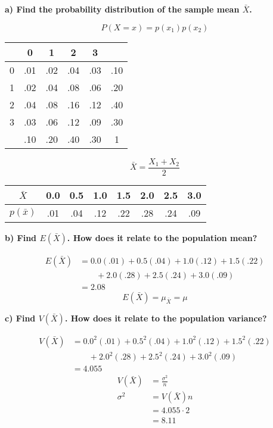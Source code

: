 \documentclass[12pt, letter]{article}
\begin{document}
\qquad \textbf{a) Find the probability distribution of the sample mean $\bar{X}$.}
\begin{center}
	$$P(X = x) = p(x_{1})p(x_{2})$$
	\newline
	\newline
	\def\arraystretch{1.2}
	\begin{tabular}{c|cccc|c}
		\backslashbox{$X_{2}$}{$X_{1}$} & 0 & 1 & 2 & 3 & \\
		\hline
		0 & .01 & .02 & .04 & .03 & .10 \\
		1 & .02 & .04 & .08 & .06 & .20 \\
		2 & .04 & .08 & .16 & .12 & .40 \\
		3 & .03 & .06 & .12 & .09 & .30 \\
		\hline
		& .10 & .20 & .40 & .30 & 1
	\end{tabular}
	
	$$\bar{X} = \frac{X_{1} + X_{2}}{2}$$
	
	\def\arraystretch{1.2}
	\begin{tabular}{|c|c|c|c|c|c|c|c|}
		\hline
		$\bar{X}$ & 0.0 & 0.5 & 1.0 & 1.5 & 2.0 & 2.5 & 3.0 \\
		\hline
		$p(\bar{x})$ & .01 & .04 & .12 & .22 & .28 & .24 & .09 \\
		\hline
	\end{tabular}
\end{center}

\qquad \textbf{b) Find $E(\bar{X})$. How does it relate to the population mean?}
\begin{center}
	\begin{align*}
		E(\bar{X}) &= 0.0(.01) + 0.5(.04) + 1.0(.12) + 1.5(.22) \\
		& \qquad + 2.0(.28) + 2.5(.24) + 3.0(.09) \\
		&= \boxed{2.08}
	\end{align*}
	$$\boxed{E(\bar{X}) = \mu_{\bar{X}} = \mu}$$
\end{center}

\pagebreak

\qquad \textbf{c) Find $V(\bar{X})$. How does it relate to the population variance?}
\begin{center}
	\begin{align*}
		V(\bar{X}) &= 0.0^{2}(.01) + 0.5^{2}(.04) + 1.0^{2}(.12) + 1.5^{2}(.22) \\
		& \qquad + 2.0^{2}(.28) + 2.5^{2}(.24) + 3.0^{2}(.09) \\
		&= \boxed{4.055}
	\end{align*}
	\begin{align*}
		V(\bar{X}) &= \frac{\sigma^{2}}{n} \\
		\sigma^{2} &= V(\bar{X})n \\
		&= 4.055 \cdot 2 \\
		&= \boxed{8.11}
	\end{align*}
\end{center}
\end{document}
